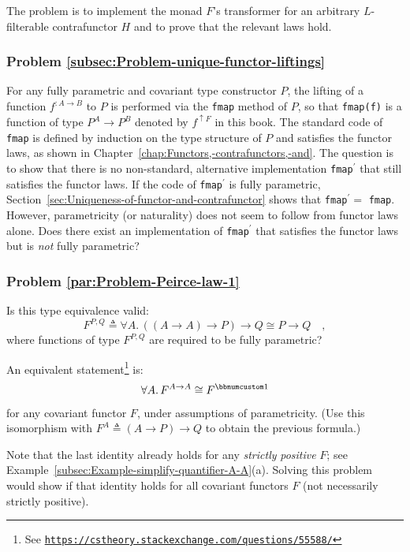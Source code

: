 The problem is to implement the monad $F$\textsf{'}s transformer for an arbitrary
$L$-filterable contrafunctor $H$ and to prove that the relevant
laws hold.

\subsubsection{Problem \label{subsec:Problem-unique-functor-liftings}\ref{subsec:Problem-unique-functor-liftings}}

For any fully parametric and covariant type constructor $P$, the
lifting of a function $f^{:A\rightarrow B}$ to $P$ is performed
via the \lstinline!fmap! method of $P$, so that \lstinline!fmap(f)!
is a function of type $P^{A}\rightarrow P^{B}$ denoted by $f^{\uparrow F}$
in this book. The standard code of \lstinline!fmap! is defined by
induction on the type structure of $P$ and satisfies the functor
laws, as shown in Chapter~\ref{chap:Functors,-contrafunctors,-and}.
The question is to show that there is no non-standard, alternative
implementation \lstinline!fmap!$^{\prime}$ that still satisfies
the functor laws. If the code of \lstinline!fmap!$^{\prime}$ is
fully parametric, Section~\ref{sec:Uniqueness-of-functor-and-contrafunctor}
shows that \lstinline!fmap!$^{\prime}=$ \lstinline!fmap!. However,
parametricity (or naturality) does not seem to follow from functor
laws alone. Does there exist an implementation of \lstinline!fmap!$^{\prime}$
that satisfies the functor laws but is \emph{not} fully parametric?

\subsubsection{Problem \label{par:Problem-Peirce-law-1}\ref{par:Problem-Peirce-law-1}}

Is this type equivalence valid:
\[
F^{P,Q}\triangleq\forall A.\,((A\rightarrow A)\rightarrow P)\rightarrow Q\cong P\rightarrow Q\quad,
\]
where functions of type $F^{P,Q}$ are required to be fully parametric?

An equivalent statement\footnote{See \texttt{\href{https://cstheory.stackexchange.com/questions/55588/}{https://cstheory.stackexchange.com/questions/55588/}}}
is:
\[
\forall A.\,F^{A\rightarrow A}\cong F^{\bbnum 1}
\]
for any covariant functor $F$, under assumptions of parametricity.
(Use this isomorphism with $F^{A}\triangleq(A\rightarrow P)\rightarrow Q$
to obtain the previous formula.)

Note that the last identity already holds for any \emph{strictly}
\emph{positive} $F$; see Example~\ref{subsec:Example-simplify-quantifier-A-A}(a).
Solving this problem would show if that identity holds for all covariant
functors $F$ (not necessarily strictly positive).

